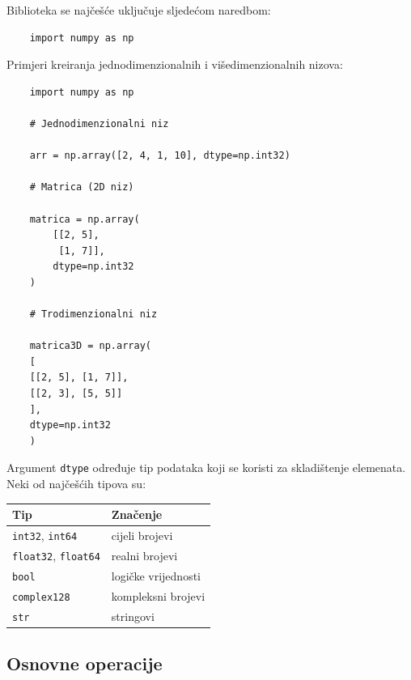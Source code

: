 Biblioteka se najčešće uključuje sljedećom naredbom:

\begin{verbatim}
	import numpy as np
\end{verbatim}

Primjeri kreiranja jednodimenzionalnih i višedimenzionalnih nizova:

\begin{verbatim}
	import numpy as np
	
	# Jednodimenzionalni niz
	
	arr = np.array([2, 4, 1, 10], dtype=np.int32)
	
	# Matrica (2D niz)
	
	matrica = np.array(
	    [[2, 5],
	     [1, 7]],
	    dtype=np.int32
	)
	
	# Trodimenzionalni niz
	  
	matrica3D = np.array(
	[
	[[2, 5], [1, 7]],
	[[2, 3], [5, 5]]
	],
	dtype=np.int32
	)
\end{verbatim}

Argument \texttt{dtype} određuje tip podataka koji se koristi za skladištenje elemenata. Neki od najčešćih tipova su:

\begin{center}
	\begin{tabular}{ll}
		\textbf{Tip} & \textbf{Značenje} \\ \hline
		\texttt{int32}, \texttt{int64} & cijeli brojevi \\
		\texttt{float32}, \texttt{float64} & realni brojevi \\
		\texttt{bool} & logičke vrijednosti \\
		\texttt{complex128} & kompleksni brojevi \\
		\texttt{str} & stringovi  \\ \hline \hline
	\end{tabular} 
\end{center}

\subsection*{Osnovne operacije}

